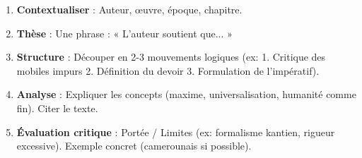\documentclass[11pt]{article}
\begin{document}
\begin{bilan}
\begin{methode}
\begin{enumerate}
    \item \textbf{Contextualiser} : Auteur, œuvre, époque, chapitre.
    \item \textbf{Thèse} : Une phrase : « L'auteur soutient que... »
    \item \textbf{Structure} : Découper en 2-3 mouvements logiques (ex: 1. Critique des mobiles impurs 2. Définition du devoir 3. Formulation de l'impératif).
    \item \textbf{Analyse} : Expliquer les concepts (maxime, universalisation, humanité comme fin). Citer le texte.
    \item \textbf{Évaluation critique} : Portée / Limites (ex: formalisme kantien, rigueur excessive). Exemple concret (camerounais si possible).
\end{enumerate}
\end{methode}

\end{bilan}
\end{document}
